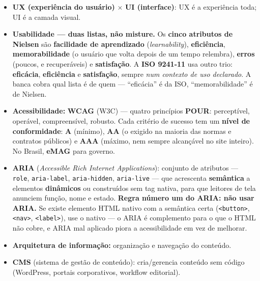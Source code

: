 \begin{itemize}
\item \textbf{UX (experiência do usuário)} $\times$ \textbf{UI
(interface)}: UX é a experiência toda; UI é a camada visual.
\item \textbf{Usabilidade --- duas listas, não misture.} Os \textbf{cinco
atributos de Nielsen} são \textbf{facilidade de aprendizado}
(\emph{learnability}), \textbf{eficiência}, \textbf{memorabilidade}
(o usuário que volta depois de um tempo relembra), \textbf{erros} (poucos, e
recuperáveis) e \textbf{satisfação}. A \textbf{ISO 9241-11} usa outro trio:
\textbf{eficácia}, \textbf{eficiência} e \textbf{satisfação}, sempre
\emph{num contexto de uso declarado}. A banca cobra qual lista é de quem ---
``eficácia'' é da ISO, ``memorabilidade'' é de Nielsen.
\item \textbf{Acessibilidade:} \textbf{WCAG} (W3C) --- quatro princípios
\textbf{POUR}: perceptível, operável, compreensível, robusto. Cada critério
de sucesso tem um \textbf{nível de conformidade}: \textbf{A} (mínimo),
\textbf{AA} (o exigido na maioria das normas e contratos públicos) e
\textbf{AAA} (máximo, nem sempre alcançável no site inteiro). No Brasil,
\textbf{eMAG} para governo.
\item \textbf{ARIA} (\textit{Accessible Rich Internet Applications}):
conjunto de atributos --- \texttt{role}, \texttt{aria-label},
\texttt{aria-hidden}, \texttt{aria-live} --- que acrescenta \textbf{semântica}
a elementos \textbf{dinâmicos} ou construídos sem tag nativa, para que
leitores de tela anunciem função, nome e estado. \textbf{Regra número um do
ARIA: não usar ARIA.} Se existe elemento HTML nativo com a semântica certa
(\texttt{<button>}, \texttt{<nav>}, \texttt{<label>}), use o nativo --- o
ARIA é complemento para o que o HTML não cobre, e ARIA mal aplicado piora a
acessibilidade em vez de melhorar.
\item \textbf{Arquitetura de informação:} organização e navegação do
conteúdo.
\item \textbf{CMS} (sistema de gestão de conteúdo): cria/gerencia conteúdo
sem código (WordPress, portais corporativos, workflow editorial).
\end{itemize}

